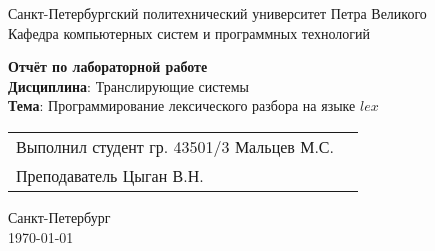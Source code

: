 
\begin{titlepage}
\centering
Санкт-Петербургский политехнический университет Петра Великого \\
\vspace{0.15cm}
Кафедра компьютерных систем и программных технологий \\
\vspace{6.5cm}

{\centering \textbf{Отчёт по лабораторной работе} \\ 
\vspace{0.15cm}
\textbf{Дисциплина}: Транслирующие системы \\
\vspace{0.15cm}
\textbf{Тема}: Программирование лексического разбора на языке $lex$} \\

\vspace{6.5cm}

\begin{table}[H]
\begin{tabular}{p{\textwidth}@{}r}
{Выполнил студент гр. 43501/3} \hfill {Мальцев  М.С.} \\
{Преподаватель} \hfill {Цыган В.Н.} \\
\end{tabular}
\end{table}
\vfill

{\centering Санкт-Петербург \\ 
\vspace{0.15cm}
\today}
\end{titlepage}